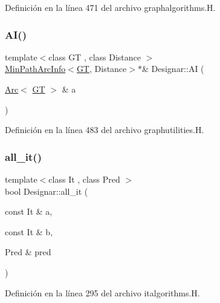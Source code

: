 Definición en la línea 471 del archivo graphalgorithms.\+H.

\mbox{\label{namespace_designar_a34a01d7c7eb615d616c2077f3b5473ea}} 
\subsubsection{\texorpdfstring{A\+I()}{AI()}}
{\footnotesize\ttfamily template$<$class GT , class Distance $>$ \\
\hyperlink{class_designar_1_1_min_path_arc_info}{Min\+Path\+Arc\+Info}$<$\hyperlink{demo-buildgraph_8_c_a3001c40d2c31ca87ed96cd7d1334a55e}{GT}, Distance$>$$\ast$\& Designar\+::\+AI (\begin{DoxyParamCaption}\item[{\hyperlink{namespace_designar_a3f55fb5513d62ff47cbc8f72b8e95d6f}{Arc}$<$ \hyperlink{demo-buildgraph_8_c_a3001c40d2c31ca87ed96cd7d1334a55e}{GT} $>$ \&}]{a }\end{DoxyParamCaption})\hspace{0.3cm}{\ttfamily [inline]}}



Definición en la línea 483 del archivo graphutilities.\+H.

\mbox{\label{namespace_designar_a1e8a8bf79e4dba3316207968f5c9ee27}} 
\subsubsection{\texorpdfstring{all\+\_\+it()}{all\_it()}\hspace{0.1cm}{\footnotesize\ttfamily [1/2]}}
{\footnotesize\ttfamily template$<$class It , class Pred $>$ \\
bool Designar\+::all\+\_\+it (\begin{DoxyParamCaption}\item[{const It \&}]{a,  }\item[{const It \&}]{b,  }\item[{Pred \&}]{pred }\end{DoxyParamCaption})}



Definición en la línea 295 del archivo italgorithms.\+H.

\mbox{\label{namespace_designar_ab48bfea523a4a61cd62aa56fff325920}} 
